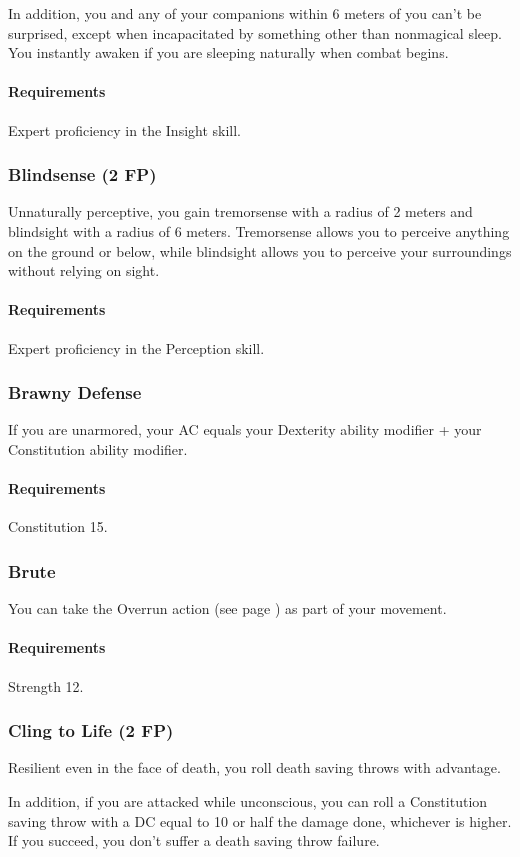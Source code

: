     In addition, you and any of your companions within 6 meters of you can't be surprised, except when incapacitated by something other than nonmagical sleep.
    You instantly awaken if you are sleeping naturally when combat begins.
    \paragraph{Requirements} Expert proficiency in the Insight skill.
\subsubsection{Blindsense (2 FP)} \label{feat::blindsense}
    Unnaturally perceptive, you gain tremorsense with a radius of 2 meters and blindsight with a radius of 6 meters.
    Tremorsense allows you to perceive anything on the ground or below, while blindsight allows you to perceive your surroundings without relying on sight.
    \paragraph{Requirements} Expert proficiency in the Perception skill.
\subsubsection{Brawny Defense} \label{feat::brawnydefense}
    If you are unarmored, your AC equals your Dexterity ability modifier + your Constitution ability modifier.
    \paragraph{Requirements} Constitution 15.
\subsubsection{Brute} \label{feat::brute}
    You can take the Overrun action (see page \pageref{act::overrun}) as part of your movement.
    \paragraph{Requirements} Strength 12.
\subsubsection{Cling to Life (2 FP)} \label{feat::clingtolife}
    Resilient even in the face of death, you roll death saving throws with advantage.

    In addition, if you are attacked while unconscious, you can roll a Constitution saving throw with a DC equal to 10 or half the damage done, whichever is higher.
    If you succeed, you don't suffer a death saving throw failure.
